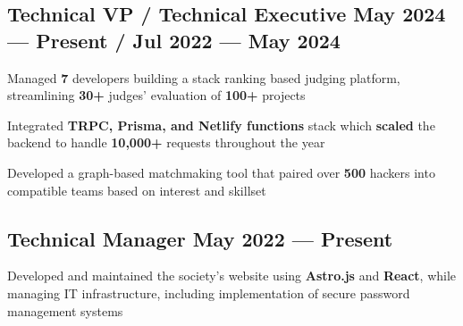 \subsection{{Technical VP / Technical Executive \hfill May 2024 --- Present / Jul 2022 --- May 2024}}
\begin{zitemize}
    \item Managed \textbf{7} developers building a stack ranking based judging platform, streamlining \textbf{30+} judges' evaluation of \textbf{100+} projects
    \item Integrated \textbf{TRPC, Prisma, and Netlify functions} stack which \textbf{scaled} the backend to handle \textbf{10,000+} requests throughout the year
    \item Developed a graph-based matchmaking tool that paired over \textbf{500} hackers into compatible teams based on interest and skillset
\end{zitemize}

\vspace{0.3cm}\subsection{{Technical Manager  \hfill May 2022 --- Present}}
\begin{zitemize}
    \item Developed and maintained the society's website using \textbf{Astro.js} and \textbf{React}, while managing IT infrastructure, including implementation of secure password management systems

\end{zitemize}